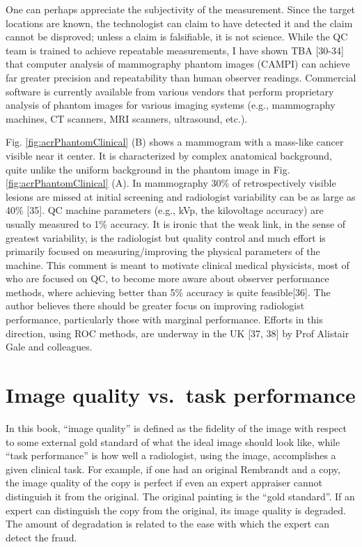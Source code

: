 \documentclass[
]{book}
\begin{document}
One can perhaps appreciate the subjectivity of the measurement. Since the target locations are known, the technologist can claim to have detected it and the claim cannot be disproved; unless a claim is falsifiable, it is not science. While the QC team is trained to achieve repeatable measurements, I have shown TBA {[}30-34{]} that computer analysis of mammography phantom images (CAMPI) can achieve far greater precision and repeatability than human observer readings. Commercial software is currently available from various vendors that perform proprietary analysis of phantom images for various imaging systems (e.g., mammography machines, CT scanners, MRI scanners, ultrasound, etc.).

Fig. \ref{fig:acrPhantomClinical} (B) shows a mammogram with a mass-like cancer visible near it center. It is characterized by complex anatomical background, quite unlike the uniform background in the phantom image in Fig. \ref{fig:acrPhantomClinical} (A). In mammography 30\% of retrospectively visible lesions are missed at initial screening and radiologist variability can be as large as 40\% {[}35{]}. QC machine parameters (e.g., kVp, the kilovoltage accuracy) are usually measured to 1\% accuracy. It is ironic that the weak link, in the sense of greatest variability, is the radiologist but quality control and much effort is primarily focused on measuring/improving the physical parameters of the machine. This comment is meant to motivate clinical medical physicists, most of who are focused on QC, to become more aware about observer performance methods, where achieving better than 5\% accuracy is quite feasible{[}36{]}. The author believes there should be greater focus on improving radiologist performance, particularly those with marginal performance. Efforts in this direction, using ROC methods, are underway in the UK {[}37, 38{]} by Prof Alistair Gale and colleagues.

\hypertarget{image-quality-vs.-task-performance}{%
\section{Image quality vs.~task performance}\label{image-quality-vs.-task-performance}}

In this book, ``image quality'' is defined as the fidelity of the image with respect to some external gold standard of what the ideal image should look like, while ``task performance'' is how well a radiologist, using the image, accomplishes a given clinical task. For example, if one had an original Rembrandt and a copy, the image quality of the copy is perfect if even an expert appraiser cannot distinguish it from the original. The original painting is the ``gold standard''. If an expert can distinguish the copy from the original, its image quality is degraded. The amount of degradation is related to the ease with which the expert can detect the fraud.
\end{document}
